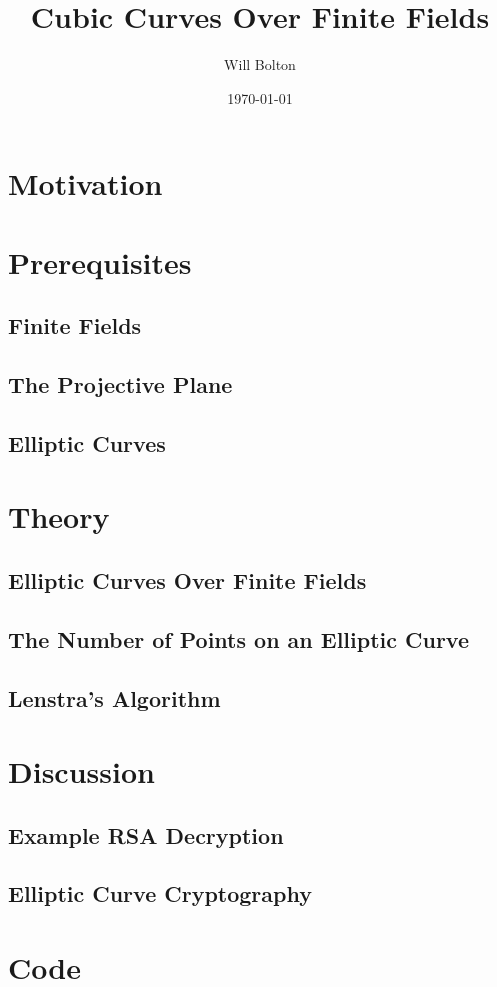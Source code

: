 \documentclass[a4paper,12pt,titlepage,oneside]{article}
\title{Cubic Curves Over Finite Fields}
\author{Will Bolton}
\date{\today}
\begin{document}
\maketitle
\tableofcontents
\clearpage

\section*{Motivation}

\nocite{*}
\clearpage

\section{Prerequisites}
\subsection{Finite Fields}

\subsection{The Projective Plane}

\subsection{Elliptic Curves}

\clearpage

\section{Theory}
\subsection{Elliptic Curves Over Finite Fields}

\subsection{The Number of Points on an Elliptic Curve}

\subsection{Lenstra's Algorithm}

\clearpage

\section{Discussion}
\subsection{Example RSA Decryption}

\subsection{Elliptic Curve Cryptography}

\clearpage

\appendix
\section{Code}

\clearpage


\end{document}
